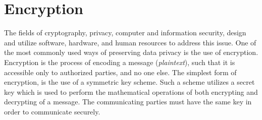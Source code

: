 \section{Encryption}\label{s:encryption}
The fields of cryptography, privacy, computer and information security, design and utilize software, hardware, and human resources to address this issue.
One of the most commonly used ways of preserving data privacy is the use of encryption. Encryption is the process of encoding a message (\emph{plaintext}), such that it is accessible only to authorized parties, and no one else.
The simplest form of encryption, is the use of a symmetric key scheme. Such a scheme utilizes a secret key which is used to perform the mathematical operations of both encrypting and decrypting of a message.
The communicating parties must have the same key in order to communicate securely.
